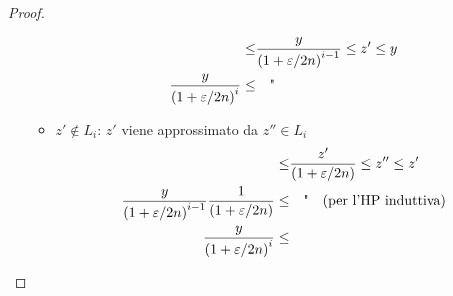 \begin{lemma}
\begin{proof}
\begin{enumerate}
\begin{itemize}
                        \begin{align*}
                            \leq
                            &
                            \frac{y}{
                                \left( 
                                1+
                                \varepsilon / 2n
                                \right)^{i-1}
                            }
                            \leq z' \leq y
                            \\
                            \frac{y}{
                                \left( 
                                1+
                                \varepsilon / 2n
                                \right)^{i}
                            }
                            \leq
                            &
                            \quad
                            \text{\textquotedbl}
                        \end{align*}
                    \item $z' \notin L_i$: $z'$ viene approssimato da $z'' \in L_{i} $
                        \begin{align*}
                            \leq
                            &
                            \frac{z'}{
                                \left( 
                                1+
                                \varepsilon / 2n
                                \right)
                            } \leq z'' \leq z'
                            \\
                            \frac{y}{
                                \left( 
                                1+
                                \varepsilon / 2n
                                \right)^{i-1}
                            }
                            \frac{1}{
                                \left( 
                                1+
                                \varepsilon / 2n
                                \right)
                            }
                            \leq
                            &
                            \quad
                            \text{\textquotedbl}
                            \quad \text{(per l'HP induttiva)}
                            \\
                            \frac{y}{
                                \left( 
                                1+
                                \varepsilon / 2n
                                \right)^{i}
                            }
                            \leq
                            &
                            \quad

\end{align*}
\end{itemize}
\end{enumerate}
\end{proof}
\end{lemma}
